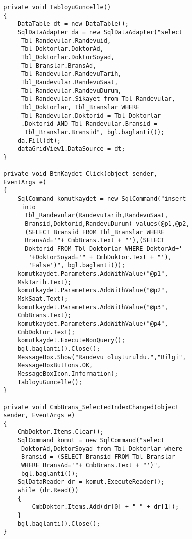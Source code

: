 \begin{lstlisting}
        private void TabloyuGuncelle()
        {
            DataTable dt = new DataTable();
            SqlDataAdapter da = new SqlDataAdapter("select
             Tbl_Randevular.Randevuid, 
             Tbl_Doktorlar.DoktorAd, 
             Tbl_Doktorlar.DoktorSoyad, 
             Tbl_Branslar.BransAd, 
             Tbl_Randevular.RandevuTarih, 
             Tbl_Randevular.RandevuSaat, 
             Tbl_Randevular.RandevuDurum, 
             Tbl_Randevular.Sikayet from Tbl_Randevular, 
             Tbl_Doktorlar, Tbl_Branslar WHERE 
             Tbl_Randevular.Doktorid = Tbl_Doktorlar
             .Doktorid AND Tbl_Randevular.Bransid =
              Tbl_Branslar.Bransid", bgl.baglanti());
            da.Fill(dt);
            dataGridView1.DataSource = dt;
        }

        private void BtnKaydet_Click(object sender, 
        EventArgs e)
        {
            SqlCommand komutkaydet = new SqlCommand("insert
             into
              Tbl_Randevular(RandevuTarih,RandevuSaat,
              Bransid,Doktorid,RandevuDurum) values(@p1,@p2,
              (SELECT Bransid FROM Tbl_Branslar WHERE 
              BransAd='"+ CmbBrans.Text + "'),(SELECT 
              Doktorid FROM Tbl_Doktorlar WHERE DoktorAd+'
               '+DoktorSoyad='" + CmbDoktor.Text + "'),
               'False')", bgl.baglanti());
            komutkaydet.Parameters.AddWithValue("@p1", 
            MskTarih.Text);
            komutkaydet.Parameters.AddWithValue("@p2", 
            MskSaat.Text);
            komutkaydet.Parameters.AddWithValue("@p3",
            CmbBrans.Text);
            komutkaydet.Parameters.AddWithValue("@p4",
            CmbDoktor.Text);
            komutkaydet.ExecuteNonQuery();
            bgl.baglanti().Close();
            MessageBox.Show("Randevu oluşturuldu.","Bilgi",
            MessageBoxButtons.OK,
            MessageBoxIcon.Information);
            TabloyuGuncelle();
        }

        private void CmbBrans_SelectedIndexChanged(object 
        sender, EventArgs e)
        {
            CmbDoktor.Items.Clear();
            SqlCommand komut = new SqlCommand("select
             DoktorAd,DoktorSoyad from Tbl_Doktorlar where 
             Bransid = (SELECT Bransid FROM Tbl_Branslar 
             WHERE BransAd='"+ CmbBrans.Text + "')", 
             bgl.baglanti());
            SqlDataReader dr = komut.ExecuteReader();
            while (dr.Read())
            {
                CmbDoktor.Items.Add(dr[0] + " " + dr[1]);
            }
            bgl.baglanti().Close();
        }


\end{lstlisting}
